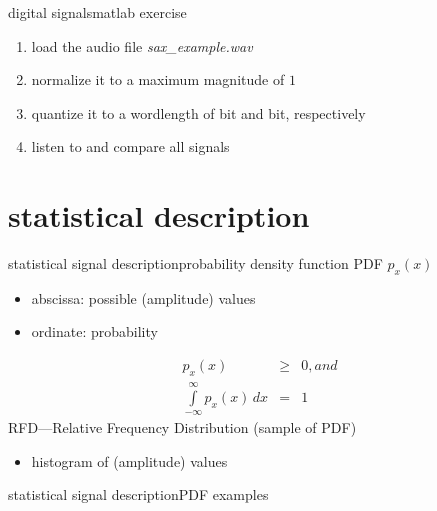             \begin{frame}{digital signals}{matlab exercise}
                
                \begin{enumerate}
                    \item   load the audio file \textsl{sax\_example.wav}
                    \item   normalize it to a maximum magnitude of $1$
                    \item   quantize it to a wordlength of \unit[8]{bit} and \unit[4]{bit}, respectively
                    \item   listen to and compare all signals
                \end{enumerate}
            \end{frame}

        \section{statistical description}
            \begin{frame}{statistical signal description}{probability density function}
                PDF $p_x(x)$
                \begin{itemize}
                    \item	abscissa: possible (amplitude) values
                    \item	ordinate: probability
                \end{itemize}
                \pause
                \begin{eqnarray*}
                    p_x(x)&\geq& 0 , and\\	
                    \int\limits_{-\infty}^{\infty}{p_x(x)\, dx} &=& 1	
                \end{eqnarray*}
                \pause
                RFD---Relative Frequency Distribution (sample of PDF)
                \begin{itemize}
                    \item[] histogram of (amplitude) values
                \end{itemize}
            \end{frame}	
            
            \begin{frame}{statistical signal description}{PDF examples}
                \pause
            \end{frame}
                

